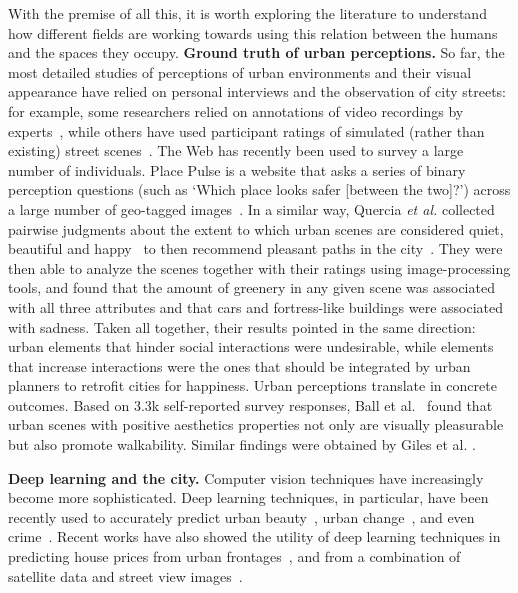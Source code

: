 With the premise of all this, it is worth exploring the literature to understand how different fields are working towards using this relation between the humans and the spaces they occupy.
\vspace{4pt}\noindent
\textbf{Ground truth of urban perceptions.} So far, the most detailed studies of perceptions of urban environments and their visual appearance have relied on personal interviews and the observation of city streets: for example, some researchers relied on annotations of video recordings by experts~\cite{sampson04seeing}, while others have used participant ratings of simulated (rather than existing) street scenes~\cite{lindal2012}. The Web has recently been used to survey a large number of individuals. Place Pulse is a website that asks a series of binary perception questions (such as `Which place looks safer [between the two]?') across a large number of geo-tagged images~\cite{salesses2013collaborative}. In a similar way, Quercia \emph{et al.} collected pairwise judgments about the extent to which urban scenes are considered quiet, beautiful and happy~\cite{quercia2014aesthetic} to then recommend pleasant paths in the city~\cite{quercia2014shortest}. They were then able to analyze the scenes together with their ratings using image-processing tools, and found that the amount of greenery in any given scene was associated with all three attributes and that cars and fortress-like buildings were associated with sadness. Taken all together, their results pointed in the same direction: urban elements that hinder social interactions were undesirable, while elements that increase interactions were the ones that should be integrated by urban planners to retrofit cities for happiness. Urban perceptions translate in concrete outcomes. Based on 3.3k self-reported survey responses,  Ball et al.~\cite{ball2001perceived} found that urban scenes with positive aesthetics properties  not only are visually  pleasurable but also promote walkability. Similar findings were obtained by Giles et al. \cite{giles2005increasing}.

\vspace{4pt}\noindent
\textbf{Deep learning and the city.} Computer vision techniques have increasingly become more sophisticated. Deep learning techniques, in particular, have been recently used to accurately predict urban beauty~\cite{dubey2016deep,seresinhe2017using}, urban change~\cite{naik2017computer}, and even crime~\cite{DeNadai16,arietta2014city}.  Recent works have also showed the utility of deep learning techniques in predicting house prices from urban frontages~\cite{frontage}, and from a combination of satellite data and street view images~\cite{law2018take}.

